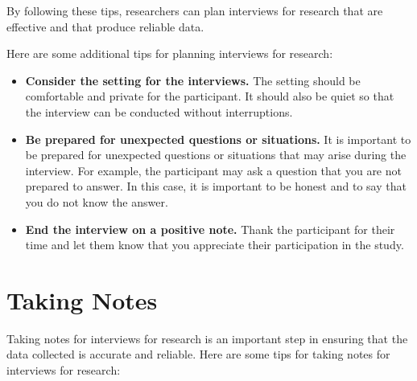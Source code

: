 \documentclass[
  b5paper]{book}
\begin{document}
By following these tips, researchers can plan interviews for research that are effective and that produce reliable data.

Here are some additional tips for planning interviews for research:

\begin{itemize}
\item
  \textbf{Consider the setting for the interviews.} The setting should be comfortable and private for the participant. It should also be quiet so that the interview can be conducted without interruptions.
\item
  \textbf{Be prepared for unexpected questions or situations.} It is important to be prepared for unexpected questions or situations that may arise during the interview. For example, the participant may ask a question that you are not prepared to answer. In this case, it is important to be honest and to say that you do not know the answer.
\item
  \textbf{End the interview on a positive note.} Thank the participant for their time and let them know that you appreciate their participation in the study.
\end{itemize}

\hypertarget{taking-notes}{%
\section{Taking Notes}\label{taking-notes}}

Taking notes for interviews for research is an important step in ensuring that the data collected is accurate and reliable. Here are some tips for taking notes for interviews for research:
\end{document}
